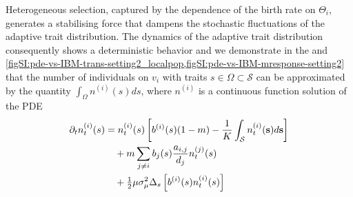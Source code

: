 Heterogeneous selection, captured by the dependence of the birth rate on $\Theta_i$, generates a stabilising force  that dampens the stochastic fluctuations of the adaptive trait distribution. The dynamics of the adaptive trait distribution consequently shows a deterministic behavior and we demonstrate in the  and \cref{figSI:pde-vs-IBM-trans-setting2_localpop,figSI:pde-vs-IBM-mresponse-setting2} that the number of individuals on $v_i$ with traits $s \in \Omega \subset \mathcal{S}$ can be approximated by the quantity $\int_\Omega n^{(i)}(s)ds$, where $n^{(i)}$ is a continuous function solution of the PDE
%
\begin{equation}\label{eq:PDE_adapt}
\begin{split}
  \partial_t n_t^{(i)}(s) &= n_t^{(i)} (s) \left[b^{(i)}(s)(1-m) - \frac{1}{K}\int_\mathcal{S}  n_t^{(i)}({\textbf s}) d{\textbf s}  \right] \\
  & \quad + m \sum_{j\neq i} b_j(s) \frac{a_{i,j}}{d_j} n_t^{(j)}(s) \\
  & \quad + \tfrac{1}{2} \mu \sigma_\mu^2 \Delta_s \left[ b^{(i)}(s) n^{(i)}_t(s) \right]
  \end{split}
\end{equation}

